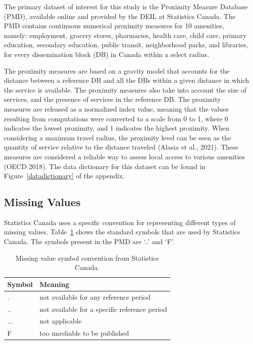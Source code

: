 \documentclass[11pt, a4paper]{article}
\begin{document}
The primary dataset of interest for this study is the Proximity Measure Database (PMD), available online and provided by the DEIL at Statistics Canada. The PMD contains continuous numerical proximity measures for 10 amenities, namely: employment, grocery stores, pharmacies, health care, child care, primary education, secondary education, public transit, neighborhood parks, and libraries, for every dissemination block (DB) in Canada within a select radius.
\par
The proximity measures are based on a gravity model that accounts for the distance between a reference DB and all the DBs within a given distance in which the service is available. The proximity measures also take into account the size of services, and the presence of services in the reference DB. The proximity measures are released as a normalized index value, meaning that the values resulting from computations were converted to a scale from 0 to 1, where 0 indicates the lowest proximity, and 1 indicates the highest proximity. When considering a maximum travel radius, the proximity level can be seen as the quantity of service relative to the distance traveled (Alasia et al., 2021). These measures are considered a reliable way to assess local access to various amenities (OECD 2018). The data dictionary for this dataset can be found in Figure~\ref{datadictionary} of the appendix.







\subsection{Missing Values}


Statistics Canada uses a specific convention for representing different types of missing values. Table~\ref{missingvalues} shows the standard symbols that are used by Statistics Canada. The symbols present in the PMD are `..' and `F'.





\begin{table}[H]
\centering
\caption[Missing value symbols]{Missing value symbol convention from Statistics Canada.}\label{missingvalues}
\begin{tabular}{|l|l|}
\hline
\textbf{Symbol} & \textbf{Meaning} \\
\hline
. & not available for any reference period \\
\hline
.. & not available for a specific reference period \\
\hline
... & not applicable \\
\hline
F & too unreliable to be published \\
\hline
\end{tabular}
\end{table}
\end{document}
